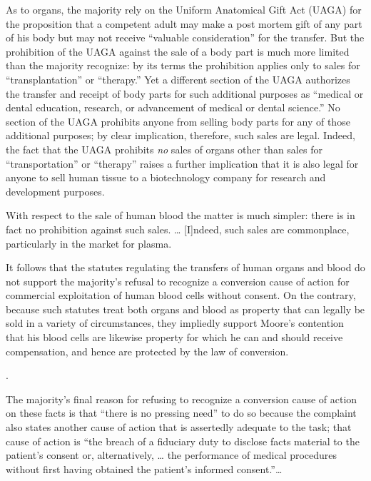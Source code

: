 As to organs, the majority rely on the Uniform Anatomical Gift Act (UAGA) for
the proposition that a competent adult may make a post mortem gift of any part
of his body but may not receive ``valuable consideration'' for the transfer.
But the prohibition of the UAGA against the sale of a body part is much more
limited than the majority recognize: by its terms the prohibition applies only
to sales for ``transplantation'' or ``therapy.'' Yet a different section of the
UAGA authorizes the transfer and receipt of body parts for such additional
purposes as ``medical or dental education, research, or advancement of medical
or dental science.'' No section of the UAGA prohibits anyone from selling body
parts for any of those additional purposes; by clear implication, therefore,
such sales are legal. Indeed, the fact that the UAGA prohibits \textit{no}
sales of organs other than sales for ``transportation'' or ``therapy'' raises a
further implication that it is also legal for anyone to sell human tissue to a
biotechnology company for research and development purposes.

With respect to the sale of human blood the matter is much simpler: there is in
fact no prohibition against such sales. {\dots} [I]ndeed, such sales are
commonplace, particularly in the market for plasma.

It follows that the statutes regulating the transfers of human organs and blood
do not support the majority's refusal to recognize a conversion cause of action
for commercial exploitation of human blood cells without consent. On the
contrary, because such statutes treat both organs and blood as property that
can legally be sold in a variety of circumstances, they impliedly support
Moore's contention that his blood cells are likewise property for which he can
and should receive compensation, and hence are protected by the law of
conversion. 

{.
\par}

The majority's final reason for refusing to recognize a conversion cause of
action on these facts is that ``there is no pressing need'' to do so because
the complaint also states another cause of action that is assertedly adequate
to the task; that cause of action is ``the breach of a fiduciary duty to
disclose facts material to the patient's consent or, alternatively,  {\dots} 
the performance of medical procedures without first having obtained the
patient's informed consent.''{\dots}

